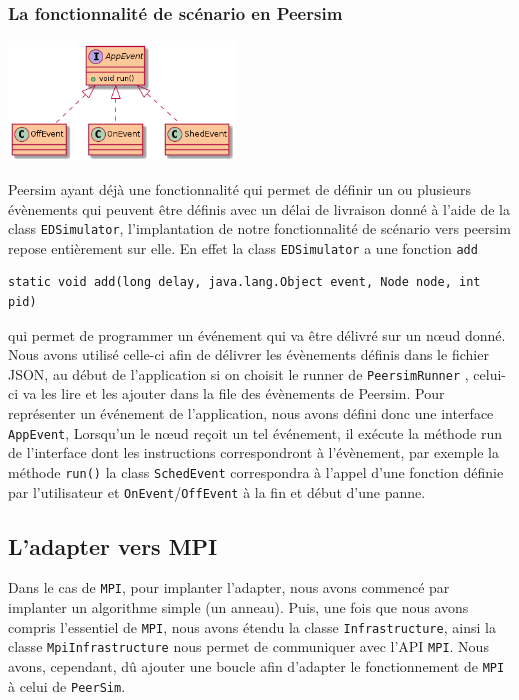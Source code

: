 \documentclass{article}
\begin{document}
						\subsubsection{La fonctionnalité de scénario en Peersim}
						\vspace{5mm}
						\hspace*{5cm} \includegraphics[width=60mm]{uml/scenPuml.png}
						
						\vspace{5mm}
						Peersim ayant déjà une fonctionnalité qui permet de définir un ou plusieurs évènements qui peuvent être définis avec un délai de livraison donné à l'aide de la class \verb|EDSimulator|,
						l'implantation de notre fonctionnalité de scénario vers peersim repose entièrement sur elle.
						En effet la class \verb|EDSimulator| a une fonction \verb|add|
						\begin{lstlisting}
static void add(long delay, java.lang.Object event, Node node, int pid)
						\end{lstlisting}
						qui permet de programmer un événement qui va être délivré sur un nœud donné. 
						\newline
						Nous avons utilisé celle-ci afin de délivrer les évènements définis dans le fichier JSON, au début de l'application si on choisit le runner de \verb|PeersimRunner| , celui-ci va 
						les lire et les ajouter dans la file des évènements de Peersim.
		Pour représenter un événement de l'application, nous avons défini donc une interface \verb|AppEvent|,
						Lorsqu'un le nœud reçoit un tel événement, il exécute la méthode run de l'interface dont les instructions correspondront à l'évènement, par exemple la méthode \verb|run()| la class \verb|SchedEvent| 
						correspondra à l'appel d'une fonction définie par l'utilisateur et  \verb|OnEvent|/\verb|OffEvent| à la fin et début d'une panne.
			
			\newpage
			\subsection{L'adapter vers MPI}
			Dans le cas de \verb|MPI|, pour implanter l'adapter, nous avons commencé par implanter un algorithme simple (un anneau). Puis, une fois que nous avons compris l'essentiel de \verb|MPI|, nous avons étendu la classe \verb|Infrastructure|, ainsi la classe \verb|MpiInfrastructure| nous permet de communiquer avec l'API \verb|MPI|. 
			Nous avons, cependant, dû ajouter une boucle afin d'adapter le fonctionnement de \verb|MPI| à celui de \verb|PeerSim|.
\end{document}
